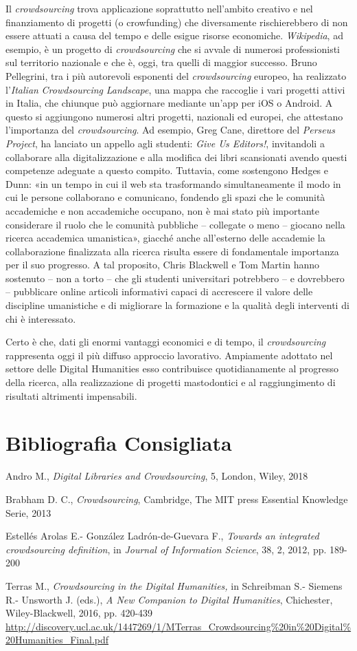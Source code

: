 Il \emph{crowdsourcing} trova applicazione soprattutto nell'ambito
creativo e nel finanziamento di progetti (o crowfunding) che
diversamente rischierebbero di non essere attuati a causa del tempo e
delle esigue risorse economiche. \emph{Wikipedia}, ad esempio, è un
progetto di \emph{crowdsourcing} che si avvale di numerosi
professionisti sul territorio nazionale e che è, oggi, tra quelli di
maggior successo. Bruno Pellegrini, tra i più autorevoli esponenti del
\emph{crowdsourcing} europeo, ha realizzato l'\emph{Italian}
\emph{Crowdsourcing} \emph{Landscape}, una mappa che raccoglie i vari
progetti attivi in Italia, che chiunque può aggiornare mediante un'app
per iOS o Android. A questo si aggiungono numerosi altri progetti,
nazionali ed europei, che attestano l'importanza del
\emph{crowdsourcing}. Ad esempio, Greg Cane, direttore del \emph{Perseus
Project}, ha lanciato un appello agli studenti: \emph{Give Us Editors!},
invitandoli a collaborare alla digitalizzazione e alla modifica dei
libri scansionati avendo questi competenze adeguate a questo compito.
Tuttavia, come sostengono Hedges e Dunn: «in un tempo in cui il web sta
trasformando simultaneamente il modo in cui le persone collaborano e
comunicano, fondendo gli spazi che le comunità accademiche e non
accademiche occupano, non è mai stato più importante considerare il
ruolo che le comunità pubbliche -- collegate o meno -- giocano nella
ricerca accademica umanistica», giacché anche all'esterno delle
accademie la collaborazione finalizzata alla ricerca risulta essere di
fondamentale importanza per il suo progresso. A tal proposito, Chris
Blackwell e Tom Martin hanno sostenuto -- non a torto -- che gli
studenti universitari potrebbero -- e dovrebbero -- pubblicare online
articoli informativi capaci di accrescere il valore delle discipline
umanistiche e di migliorare la formazione e la qualità degli interventi
di chi è interessato.

Certo è che, dati gli enormi vantaggi economici e di tempo, il
\emph{crowdsourcing} rappresenta oggi il più diffuso approccio
lavorativo. Ampiamente adottato nel settore delle Digital Humanities
esso contribuisce quotidianamente al progresso della ricerca, alla
realizzazione di progetti mastodontici e al raggiungimento di risultati
altrimenti impensabili.

\section*{Bibliografia Consigliata}
{\parindent0pt 
Andro M., \emph{Digital Libraries and Crowdsourcing}, 5, London, Wiley,
2018

Brabham D. C., \emph{Crowdsourcing}, Cambridge, The MIT press Essential
Knowledge Serie, 2013

Estellés Arolas E.- González Ladrón-de-Guevara F., \emph{Towards an
integrated crowdsourcing definition}, in \emph{Journal of Information
Science}, 38, 2, 2012, pp. 189-200

Terras M., \emph{Crowdsourcing in the Digital Humanities,} in Schreibman
S.- Siemens R.- Unsworth J. (eds.), \emph{A New Companion to Digital
Humanities}, Chichester, Wiley-Blackwell, 2016, pp. 420-439 \url{http://discovery.ucl.ac.uk/1447269/1/MTerras_Crowdsourcing\%20in\%20Digital\%20Humanities_Final.pdf}
}

